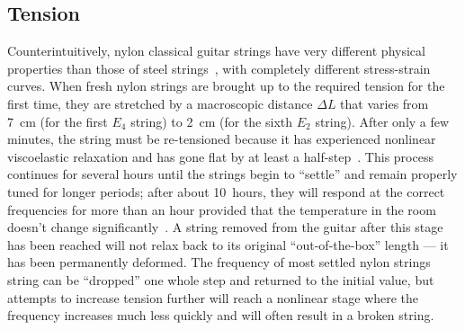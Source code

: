 

 \subsection{Tension\label{sct:model_tension}}
Counterintuitively, nylon classical guitar strings have very different physical properties than those of steel strings~\cite{ref:grimes2014stp,ref:kemp2017puw,ref:kemp2020ibg}, with completely different stress-strain curves. When fresh nylon strings are brought up to the required tension for the first time, they are stretched by a macroscopic distance $\Delta L$ that varies from 7~cm (for the first $E_4$ string) to 2~cm (for the sixth $E_2$ string). After only a few minutes, the string must be re-tensioned because it has experienced nonlinear viscoelastic relaxation and has gone flat by at least a half-step~\cite{ref:blanc1996nvb,ref:lynchaird2017mpn,ref:lynchaird2018cmp}. This process continues for several hours until the strings begin to ``settle'' and remain properly tuned for longer periods; after about 10~hours, they will respond at the correct frequencies for more than an hour provided that the temperature in the room doesn't change significantly~\cite{ref:blanc1996nvb,ref:lynchaird2017mpn}. A string removed from the guitar after this stage has been reached will not relax back to its original ``out-of-the-box'' length --- it has been permanently deformed. The frequency of most settled nylon strings string can be ``dropped'' one whole step and returned to the initial value, but attempts to increase tension further will reach a nonlinear stage where the frequency increases much less quickly and will often result in a broken string.

